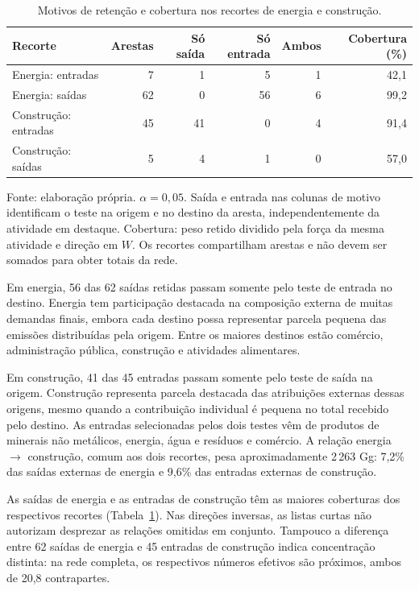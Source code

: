 \begin{table}[htbp]
\centering
\caption{Motivos de retenção e cobertura nos recortes de energia e construção.}
\label{tab:motivos-casos}
\small
\begin{tabular}{@{}lrrrrr@{}}
\toprule
Recorte & Arestas & Só saída & Só entrada & Ambos & Cobertura (\%) \\
\midrule
Energia: entradas & 7 & 1 & 5 & 1 & 42,1 \\
Energia: saídas & 62 & 0 & 56 & 6 & 99,2 \\
Construção: entradas & 45 & 41 & 0 & 4 & 91,4 \\
Construção: saídas & 5 & 4 & 1 & 0 & 57,0 \\
\bottomrule
\end{tabular}
\par\smallskip\begin{minipage}{\textwidth}\footnotesize
Fonte: elaboração própria. $\alpha=0{,}05$. Saída e entrada nas colunas de motivo identificam o teste na origem e no destino da aresta, independentemente da atividade em destaque. Cobertura: peso retido dividido pela força da mesma atividade e direção em $W$. Os recortes compartilham arestas e não devem ser somados para obter totais da rede.
\end{minipage}
\end{table}

Em energia, 56 das 62 saídas retidas passam somente pelo teste de entrada no destino. Energia tem participação destacada na composição externa de muitas demandas finais, embora cada destino possa representar parcela pequena das emissões distribuídas pela origem. Entre os maiores destinos estão comércio, administração pública, construção e atividades alimentares.

Em construção, 41 das 45 entradas passam somente pelo teste de saída na origem. Construção representa parcela destacada das atribuições externas dessas origens, mesmo quando a contribuição individual é pequena no total recebido pelo destino. As entradas selecionadas pelos dois testes vêm de produtos de minerais não metálicos, energia, água e resíduos e comércio. A relação energia $\rightarrow$ construção, comum aos dois recortes, pesa aproximadamente 2\,263 Gg: 7,2\% das saídas externas de energia e 9,6\% das entradas externas de construção.

As saídas de energia e as entradas de construção têm as maiores coberturas dos respectivos recortes (Tabela~\ref{tab:motivos-casos}). Nas direções inversas, as listas curtas não autorizam desprezar as relações omitidas em conjunto. Tampouco a diferença entre 62 saídas de energia e 45 entradas de construção indica concentração distinta: na rede completa, os respectivos números efetivos são próximos, ambos de 20,8 contrapartes.



